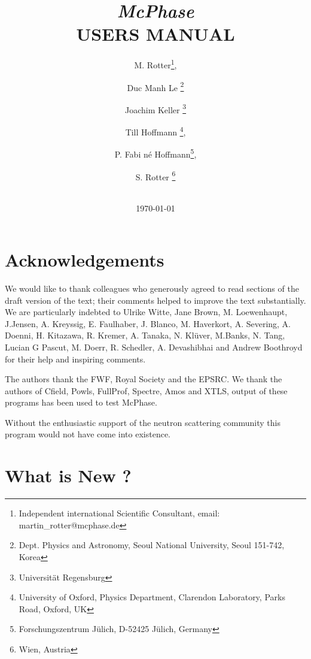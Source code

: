 \documentclass[twoside]{article}
\begin{document}
 \title{ {\Huge \bf \em McPhase} \\
 \vspace{1cm} 
{\bf   USERS MANUAL}\\
  \vspace{2cm} 
\vspace{3cm}}

\date {\vspace{2cm} 
 \vspace{2cm}
 \\ \today}

\author{M. Rotter\thanks{Independent international Scientific Consultant, email: martin\_rotter@mcphase.de}, 
\and Duc Manh Le \thanks{Dept. Physics and Astronomy, Seoul National University, Seoul 151-742, Korea}
\and Joachim Keller \thanks{Universit\"at Regensburg}
\and Till Hoffmann  \thanks{University of Oxford, Physics Department, Clarendon Laboratory, Parks Road, Oxford, UK},
\and P. Fabi n\'e Hoffmann\thanks{Forschungszentrum J\"ulich, D-52425 J\"ulich, Germany},
\and S. Rotter \thanks{Wien, Austria}
}


\maketitle
\clearpage

\section*{Acknowledgements}

We would like to thank colleagues who generously agreed to read sections of the draft version
of the text; their comments helped to improve the text substantially. We are particularly indebted to
Ulrike Witte, Jane Brown, M. Loewenhaupt, J.Jensen, A. Kreyssig, E. Faulhaber,
J. Blanco, M. Haverkort, A. Severing,
A. Doenni, H. Kitazawa, R. Kremer, A. Tanaka, N. Kl\"uver, 
M.Banks, N. Tang, Lucian G Pascut, M. Doerr, R. Schedler, A. Devashibhai
 and Andrew Boothroyd for their help and inspiring comments.

The authors thank the FWF, Royal Society and the EPSRC.
We thank the authors of Cfield, Powls, FullProf, Spectre, Amos and XTLS, output 
of these programs has been used to test McPhase. 

Without the enthusiastic support of the neutron scattering 
community this program would not have come into existence. 

\section*{What is New ?}
\end{document}
